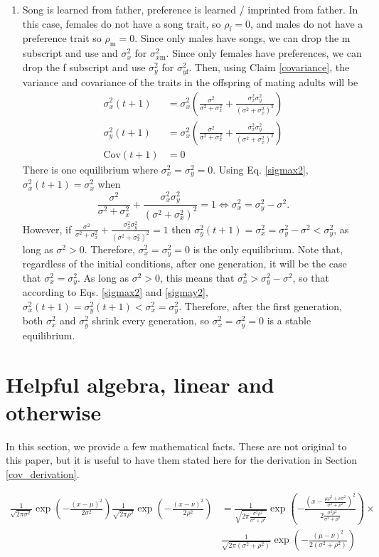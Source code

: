 \documentclass{article}
\newcommand{\x}[1]{\text{#1}}
\newcommand{\Cov}{\text{Cov}}
\begin{document}
\begin{enumerate}
\item Song is learned from father, preference is learned / imprinted from father.  In this case, females do not have a song trait, so $\rho_\x{f}=0$, and males do not have a preference trait so $\rho_\x{m}=0$. Since only males have songs, we can drop the m subscript and use and $\sigma_x^2$ for $\sigma_{x\x{m}}^2$. Since only females have preferences, we can drop the f subscript and use $\sigma_y^2$ for $\sigma_{y\x{f}}^2$. Then, using Claim \ref{covariance}, the variance and covariance of the traits in the offspring of mating adults will be 
\begin{align}
\sigma_x^2(t+1)&=\sigma_x^2\left(\frac{\sigma^2}{\sigma^2+\sigma_x^2}+\frac{\sigma_x^2\sigma_y^2}{(\sigma^2+\sigma_x^2)^2}\right) \label{sigmax2}
\\ \sigma_y^2(t+1)&=\sigma_x^2\left(\frac{\sigma^2}{\sigma^2+\sigma_x^2}+\frac{\sigma_x^2\sigma_y^2}{(\sigma^2+\sigma_x^2)^2}\right) \label{sigmay2}
\\ \Cov(t+1)&=0
\end{align}
There is one equilibrium where $\sigma_x^2=\sigma_y^2=0$. Using Eq. \ref{sigmax2}, 
$\sigma_x^2(t+1)=\sigma_x^2$ when $$ \frac{\sigma^2}{\sigma^2+\sigma_x^2}+\frac{\sigma_x^2\sigma_y^2}{(\sigma^2+\sigma_x^2)^2}=1 \Leftrightarrow \sigma_x^2=\sigma_y^2-\sigma^2.$$ However, if $\frac{\sigma^2}{\sigma^2+\sigma_x^2}+\frac{\sigma_x^2\sigma_y^2}{(\sigma^2+\sigma_x^2)^2}=1$ then $\sigma_y^2(t+1)=\sigma_x^2=\sigma_y^2-\sigma^2<\sigma_y^2$, as long as $\sigma^2>0$. Therefore, $\sigma_x^2=\sigma_y^2=0$ is the only equilibrium. Note that, regardless of the initial conditions, after one generation, it will be the case that $\sigma_x^2=\sigma_y^2$. As long as $\sigma^2>0$, this means that $\sigma_x^2>\sigma_y^2-\sigma^2$, so that according to Eqs. \ref{sigmax2} and \ref{sigmay2}, $\sigma_x^2(t+1)=\sigma_y^2(t+1)<\sigma_x^2=\sigma_y^2$. Therefore, after the first generation, both $\sigma_x^2$ and $\sigma_y^2$ shrink every generation, so $\sigma_x^2=\sigma_y^2=0$ is a stable equilibrium.

\end{enumerate}

\section{Helpful algebra, linear and otherwise}
In this section, we provide a few mathematical facts. These are not original to this paper, but it is useful to have them stated here for the derivation in Section \ref{cov_derivation}.
\begin{fact} \label{univariate}
\begin{align*}
\frac{1}{\sqrt{2\pi\sigma^2}}\exp\left(-\frac{(x-\mu)^2}{2\sigma^2}\right)\frac{1}{\sqrt{2\pi\rho^2}}\exp\left(-\frac{(x-\nu)^2}{2\rho^2}\right)&=\frac{1}{\sqrt{2\pi\frac{\sigma^2\rho^2}{\sigma^2+\rho^2}}}\exp\left(-\frac{\left(x-\frac{\mu\rho^2+\nu\sigma^2}{\sigma^2+\rho^2}\right)^2}{2\frac{\sigma^2\rho^2}{\sigma^2+\rho^2}}\right)\times
\\&\frac{1}{\sqrt{2\pi(\sigma^2+\rho^2)}}\exp\left(-\frac{(\mu-\nu)^2}{2(\sigma^2+\rho^2)}\right)
\end{align*}
\end{fact}
\end{document}
